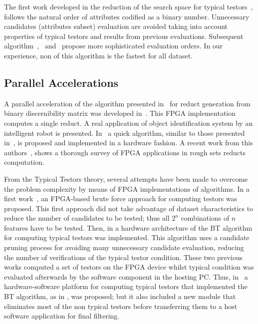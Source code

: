 \documentclass[11pt]{article}   %
\begin{document}
  The first work developed in the reduction of the search space for typical testors~\cite{Ruiz85}, follows 
  the natural order of attributes codified as a binary number. Unnecessary candidates (attributes subset)
  evaluation are avoided taking into account properties of typical testors and results from previous 
  evaluations. Subsequent algorithm~\cite{Santiesteban03},~\cite{Sanchez07} and~\cite{Lias09} propose
  more sophisticated evaluation orders. In our experience, non of this algorithm is the fastest for all dataset.
  
\subsection{Parallel Accelerations}

  A parallel acceleration of the algorithm presented in~\cite{Yang08} for reduct generation from binary
  discernibility matrix was developed in~\cite{Tiwari11,Tiwari12}. This FPGA implementation computes a 
  single reduct. A real application of object identification system by an intelligent robot is presented.
  In~\cite{Tiwari13} a quick algorithm, similar to those presented in~\cite{Chouchoulas01}, is proposed
  and implemented in a hardware fashion. A recent work from this authors~\cite{Tiwari14}, shows a thorough
  survey of FPGA applications in rough sets reducts computation.

  From the Typical Testors theory, several attempts have been made to overcome the problem 
  complexity by means of FPGA implementations of algorithms. In a first work~\cite{Cumplido06}, an 
  FPGA-based brute force approach for computing testors was proposed. This first approach did 
  not take advantage of dataset characteristics to reduce the number of candidates to be tested; 
  thus all $2^n$ combinations of $n$ features have to be tested. Then, in \cite{Rojas07} a hardware 
  architecture of the BT algorithm for computing typical testors was implemented. 
  This algorithm uses a candidate pruning process for avoiding many unnecessary candidate evaluation, 
  reducing the number of verifications of the typical testor condition. These two previous works computed 
  a set of testors on the FPGA device whilst typical condition was evaluated afterwards by the 
  software component in the hosting PC. Thus, in~\cite{Rojas12} a hardware-software platform for 
  computing typical testors that implemented the BT algorithm, as in \cite{Rojas07}, was proposed; but it also 
  included a new module that eliminates most of the non typical testors before transferring them to 
  a host software application for final filtering. 
	
\end{document}
